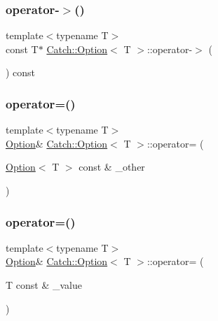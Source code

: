 \hypertarget{class_catch_1_1_option_ae8343cbc36dbb95b2dce333d2a6fdc28}{}\label{class_catch_1_1_option_ae8343cbc36dbb95b2dce333d2a6fdc28} 
\subsubsection{\texorpdfstring{operator-\/$>$()}{operator->()}\hspace{0.1cm}{\footnotesize\ttfamily [2/2]}}
{\footnotesize\ttfamily template$<$typename T$>$ \\
const T$\ast$ \hyperlink{class_catch_1_1_option}{Catch\+::\+Option}$<$ T $>$\+::operator-\/$>$ (\begin{DoxyParamCaption}{ }\end{DoxyParamCaption}) const\hspace{0.3cm}{\ttfamily [inline]}}

\hypertarget{class_catch_1_1_option_a78c65b15dd6b2fbd04c5012c43017c8f}{}\label{class_catch_1_1_option_a78c65b15dd6b2fbd04c5012c43017c8f} 
\subsubsection{\texorpdfstring{operator=()}{operator=()}\hspace{0.1cm}{\footnotesize\ttfamily [1/2]}}
{\footnotesize\ttfamily template$<$typename T$>$ \\
\hyperlink{class_catch_1_1_option}{Option}\& \hyperlink{class_catch_1_1_option}{Catch\+::\+Option}$<$ T $>$\+::operator= (\begin{DoxyParamCaption}\item[{\hyperlink{class_catch_1_1_option}{Option}$<$ T $>$ const \&}]{\+\_\+other }\end{DoxyParamCaption})\hspace{0.3cm}{\ttfamily [inline]}}

\hypertarget{class_catch_1_1_option_a2be7e343ab22d6061726d32ab4622653}{}\label{class_catch_1_1_option_a2be7e343ab22d6061726d32ab4622653} 
\subsubsection{\texorpdfstring{operator=()}{operator=()}\hspace{0.1cm}{\footnotesize\ttfamily [2/2]}}
{\footnotesize\ttfamily template$<$typename T$>$ \\
\hyperlink{class_catch_1_1_option}{Option}\& \hyperlink{class_catch_1_1_option}{Catch\+::\+Option}$<$ T $>$\+::operator= (\begin{DoxyParamCaption}\item[{T const \&}]{\+\_\+value }\end{DoxyParamCaption})\hspace{0.3cm}{\ttfamily [inline]}}

